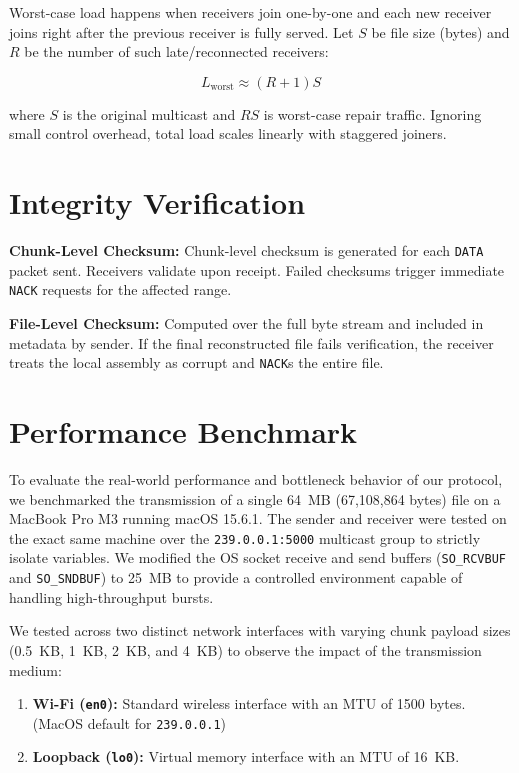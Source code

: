 \documentclass{article}
\begin{document}
Worst-case load happens when receivers join one-by-one and each new receiver joins right after the previous receiver is fully served. Let $S$ be file size (bytes) and $R$ be the number of such late/reconnected receivers:

$$
L_{\text{worst}} \approx (R+1)S
$$

where $S$ is the original multicast and $RS$ is worst-case repair traffic. Ignoring small control overhead, total load scales linearly with staggered joiners.

\section*{Integrity Verification}

\textbf{Chunk-Level Checksum:} Chunk-level checksum is generated for each \texttt{DATA} packet sent. Receivers validate upon receipt. Failed checksums trigger immediate \texttt{NACK} requests for the affected range.

\textbf{File-Level Checksum:} Computed over the full byte stream and included in metadata by sender. If the final reconstructed file fails verification, the receiver treats the local assembly as corrupt and \texttt{NACK}s the entire file.

\section*{Performance Benchmark}

To evaluate the real-world performance and bottleneck behavior of our protocol, we benchmarked the transmission of a single 64~MB (67,108,864 bytes) file on a MacBook Pro M3 running macOS 15.6.1. The sender and receiver were tested on the exact same machine over the \texttt{239.0.0.1:5000} multicast group to strictly isolate variables. We modified the OS socket receive and send buffers (\texttt{SO\_RCVBUF} and \texttt{SO\_SNDBUF}) to 25~MB to provide a controlled environment capable of handling high-throughput bursts.

We tested across two distinct network interfaces with varying chunk payload sizes (0.5~KB, 1~KB, 2~KB, and 4~KB) to observe the impact of the transmission medium:
\begin{enumerate}
	\item \textbf{Wi-Fi (\texttt{en0}):} Standard wireless interface with an MTU of 1500 bytes.  (MacOS default for \texttt{239.0.0.1})
    \item \textbf{Loopback (\texttt{lo0}):} Virtual memory interface with an MTU of 16~KB. 
\end{enumerate}
\end{document}
